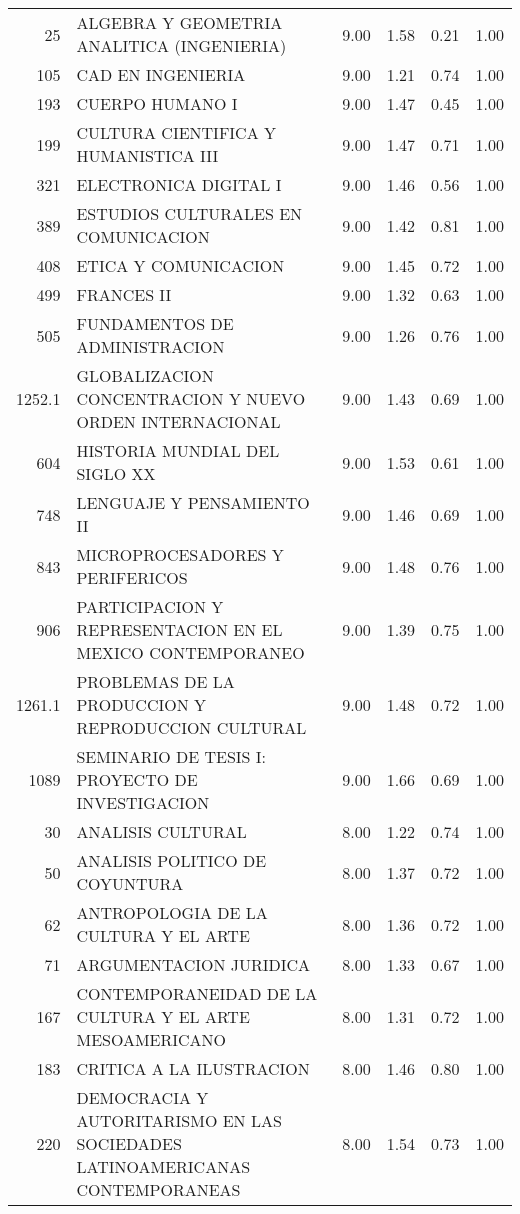 \documentclass[12pt]{article}
\begin{document}
\begin{table}[ht]
\begin{tabular}{rlrrrr}
  25 & ALGEBRA Y GEOMETRIA ANALITICA (INGENIERIA) & 9.00 & 1.58 & 0.21 & 1.00 \\ 
  105 & CAD EN INGENIERIA & 9.00 & 1.21 & 0.74 & 1.00 \\ 
  193 & CUERPO HUMANO I & 9.00 & 1.47 & 0.45 & 1.00 \\ 
  199 & CULTURA CIENTIFICA Y HUMANISTICA III & 9.00 & 1.47 & 0.71 & 1.00 \\ 
  321 & ELECTRONICA DIGITAL I & 9.00 & 1.46 & 0.56 & 1.00 \\ 
  389 & ESTUDIOS CULTURALES EN COMUNICACION & 9.00 & 1.42 & 0.81 & 1.00 \\ 
  408 & ETICA Y COMUNICACION & 9.00 & 1.45 & 0.72 & 1.00 \\ 
  499 & FRANCES II & 9.00 & 1.32 & 0.63 & 1.00 \\ 
  505 & FUNDAMENTOS DE ADMINISTRACION & 9.00 & 1.26 & 0.76 & 1.00 \\ 
  1252.1 & GLOBALIZACION CONCENTRACION Y NUEVO ORDEN INTERNACIONAL & 9.00 & 1.43 & 0.69 & 1.00 \\ 
  604 & HISTORIA MUNDIAL DEL SIGLO XX & 9.00 & 1.53 & 0.61 & 1.00 \\ 
  748 & LENGUAJE Y PENSAMIENTO II & 9.00 & 1.46 & 0.69 & 1.00 \\ 
  843 & MICROPROCESADORES Y PERIFERICOS & 9.00 & 1.48 & 0.76 & 1.00 \\ 
  906 & PARTICIPACION Y REPRESENTACION EN EL MEXICO CONTEMPORANEO & 9.00 & 1.39 & 0.75 & 1.00 \\ 
  1261.1 & PROBLEMAS DE LA PRODUCCION Y REPRODUCCION CULTURAL & 9.00 & 1.48 & 0.72 & 1.00 \\ 
  1089 & SEMINARIO DE TESIS I: PROYECTO DE INVESTIGACION & 9.00 & 1.66 & 0.69 & 1.00 \\ 
  30 & ANALISIS CULTURAL & 8.00 & 1.22 & 0.74 & 1.00 \\ 
  50 & ANALISIS POLITICO DE COYUNTURA & 8.00 & 1.37 & 0.72 & 1.00 \\ 
  62 & ANTROPOLOGIA DE LA CULTURA Y EL ARTE & 8.00 & 1.36 & 0.72 & 1.00 \\ 
  71 & ARGUMENTACION JURIDICA & 8.00 & 1.33 & 0.67 & 1.00 \\ 
  167 & CONTEMPORANEIDAD DE LA CULTURA Y EL ARTE MESOAMERICANO & 8.00 & 1.31 & 0.72 & 1.00 \\ 
  183 & CRITICA A LA ILUSTRACION & 8.00 & 1.46 & 0.80 & 1.00 \\ 
  220 & DEMOCRACIA Y AUTORITARISMO EN LAS SOCIEDADES LATINOAMERICANAS CONTEMPORANEAS & 8.00 & 1.54 & 0.73 & 1.00 \\ 

\end{tabular}
\end{table}
\end{document}
